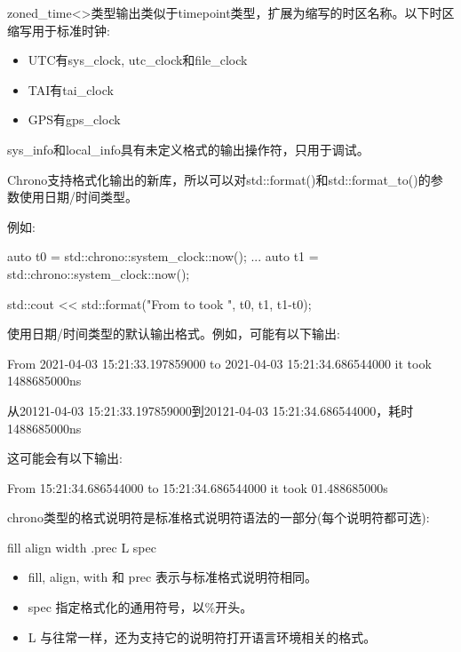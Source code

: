zoned\_time<>类型输出类似于timepoint类型，扩展为缩写的时区名称。以下时区缩写用于标准时钟:

\begin{itemize}
\item
UTC有sys\_clock, utc\_clock和file\_clock

\item
TAI有tai\_clock

\item
GPS有gps\_clock
\end{itemize}

sys\_info和local\_info具有未定义格式的输出操作符，只用于调试。


Chrono支持格式化输出的新库，所以可以对std::format()和std::format\_to()的参数使用日期/时间类型。

例如:

\begin{cpp}
auto t0 = std::chrono::system_clock::now();
...
auto t1 = std::chrono::system_clock::now();

std::cout << std::format("From {} to {}\nit took {}\n", t0, t1, t1-t0);
\end{cpp}

使用日期/时间类型的默认输出格式。例如，可能有以下输出:

\begin{shell}
From 2021-04-03 15:21:33.197859000 to 2021-04-03 15:21:34.686544000
it took 1488685000ns
\end{shell}

从20121-04-03 15:21:33.197859000到20121-04-03 15:21:34.686544000，耗时1488685000ns


这可能会有以下输出:

\begin{shell}
From 15:21:34.686544000 to 15:21:34.686544000 it took 01.488685000s
\end{shell}

chrono类型的格式说明符是标准格式说明符语法的一部分(每个说明符都可选):

\begin{shell}
fill align width .prec L spec
\end{shell}

\begin{itemize}
\item
fill, align, with 和 prec 表示与标准格式说明符相同。

\item
spec 指定格式化的通用符号，以\%开头。

\item
L 与往常一样，还为支持它的说明符打开语言环境相关的格式。
\end{itemize}

